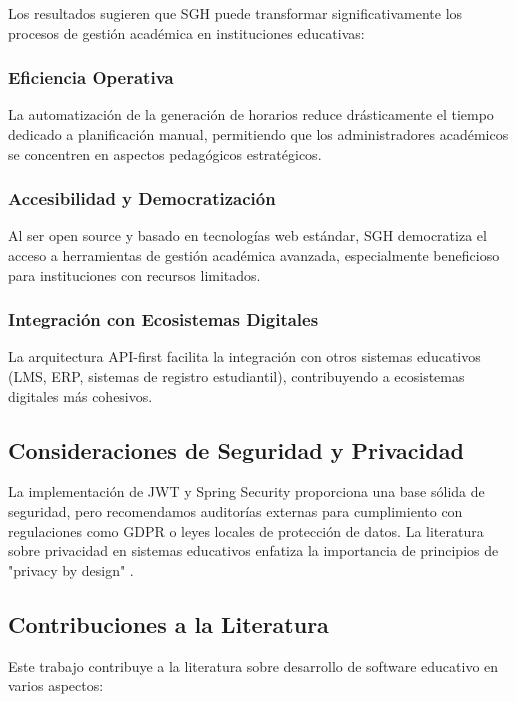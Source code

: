 Los resultados sugieren que SGH puede transformar significativamente los procesos de gestión académica en instituciones educativas:

\subsubsection{Eficiencia Operativa}

La automatización de la generación de horarios reduce drásticamente el tiempo dedicado a planificación manual, permitiendo que los administradores académicos se concentren en aspectos pedagógicos estratégicos.

\subsubsection{Accesibilidad y Democratización}

Al ser open source y basado en tecnologías web estándar, SGH democratiza el acceso a herramientas de gestión académica avanzada, especialmente beneficioso para instituciones con recursos limitados.

\subsubsection{Integración con Ecosistemas Digitales}

La arquitectura API-first facilita la integración con otros sistemas educativos (LMS, ERP, sistemas de registro estudiantil), contribuyendo a ecosistemas digitales más cohesivos.

\subsection{Consideraciones de Seguridad y Privacidad}

La implementación de JWT y Spring Security proporciona una base sólida de seguridad, pero recomendamos auditorías externas para cumplimiento con regulaciones como GDPR o leyes locales de protección de datos. La literatura sobre privacidad en sistemas educativos enfatiza la importancia de principios de "privacy by design" \cite{ye2022, react2021}.

\subsection{Contribuciones a la Literatura}

Este trabajo contribuye a la literatura sobre desarrollo de software educativo en varios aspectos:

